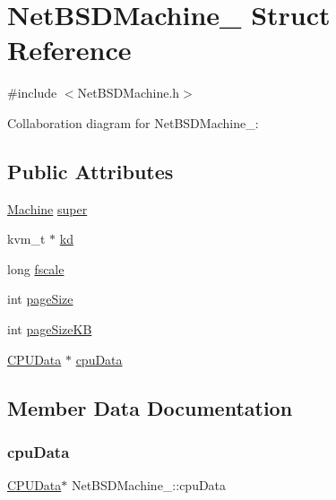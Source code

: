 \hypertarget{structNetBSDMachine__}{}\section{Net\+B\+S\+D\+Machine\+\_\+ Struct Reference}
\label{structNetBSDMachine__}


{\ttfamily \#include $<$Net\+B\+S\+D\+Machine.\+h$>$}



Collaboration diagram for Net\+B\+S\+D\+Machine\+\_\+\+:
\subsection*{Public Attributes}
\begin{DoxyCompactItemize}
\item 
\hyperlink{Machine_8h_aa3706f95e4706b9d02979efcabb1341d}{Machine} \hyperlink{structNetBSDMachine___a966e400d00a2f7f4c6bdb0f1c1b5219d}{super}
\item 
kvm\+\_\+t $\ast$ \hyperlink{structNetBSDMachine___ac6b748f8e6ed99c04678a626c9834bd0}{kd}
\item 
long \hyperlink{structNetBSDMachine___aa282438085a03fc0e994af6fa8a2b1d8}{fscale}
\item 
int \hyperlink{structNetBSDMachine___a49db2174ba9be1499493717b3608f8ef}{page\+Size}
\item 
int \hyperlink{structNetBSDMachine___af1b3eb254550f43a692700ee4587782e}{page\+Size\+KB}
\item 
\hyperlink{DragonFlyBSDMachine_8h_a144f55b34d84d75d470d730435fef363}{C\+P\+U\+Data} $\ast$ \hyperlink{structNetBSDMachine___a5730332c744638b1cc0f977079e335c3}{cpu\+Data}
\end{DoxyCompactItemize}


\subsection{Member Data Documentation}
\mbox{\label{structNetBSDMachine___a5730332c744638b1cc0f977079e335c3}} 
\subsubsection{\texorpdfstring{cpu\+Data}{cpuData}}
{\footnotesize\ttfamily \hyperlink{DragonFlyBSDMachine_8h_a144f55b34d84d75d470d730435fef363}{C\+P\+U\+Data}$\ast$ Net\+B\+S\+D\+Machine\+\_\+\+::cpu\+Data}

